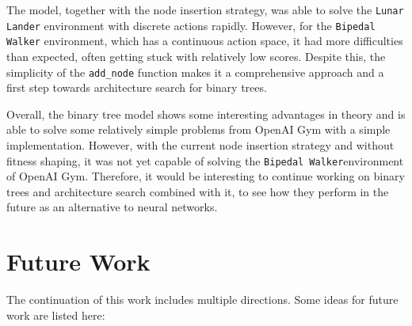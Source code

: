 The model, together with the node insertion strategy, was able to solve the \texttt{Lunar Lander} environment with discrete actions rapidly. However, for the \texttt{Bipedal Walker} environment, which has a continuous action space, it had more difficulties than expected, often getting stuck with relatively low scores. Despite this, the simplicity of the \texttt{add\_node} function makes it a comprehensive approach and a first step towards architecture search for binary trees.

Overall, the binary tree model shows some interesting advantages in theory and is able to solve some relatively simple problems from OpenAI Gym with a simple implementation. However, with the current node insertion strategy and without fitness shaping, it was not yet capable of solving the \texttt{Bipedal Walker}environment of OpenAI Gym. Therefore, it would be interesting to continue working on binary trees and architecture search combined with it, to see how they perform in the future as an alternative to neural networks.



\section{Future Work}

The continuation of this work includes multiple directions. Some ideas for future work are listed here:

